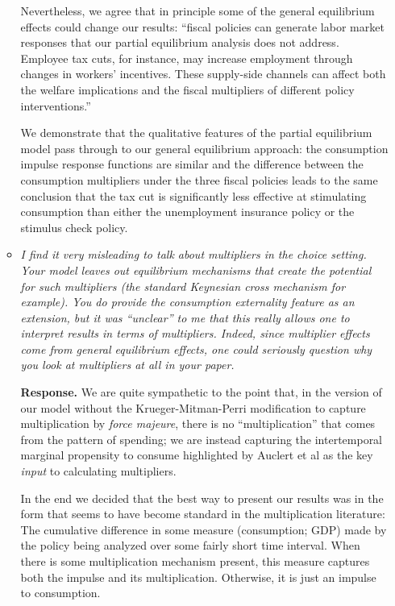 \documentclass[12pt,letterpaper,english]{article}
\begin{document}
\begin{enumerate}
\begin{itemize}
Nevertheless, we agree that in principle some of the general equilibrium effects could change our results: ``fiscal policies can generate labor market responses that our partial equilibrium
analysis does not address. Employee tax cuts, for instance, may increase employment through changes in workers’ incentives. These supply-side channels can affect both the welfare implications and the fiscal multipliers of different policy interventions.'' 

We demonstrate that the qualitative features of the partial equilibrium model pass through to our general equilibrium approach: the consumption impulse response functions are similar and the difference between the consumption multipliers under the three fiscal policies leads to the same conclusion that the tax cut is significantly less effective at stimulating consumption than either the unemployment insurance policy or the stimulus check policy.
	
	\item \textit{I find it very misleading to talk about multipliers in the choice setting. Your model leaves out equilibrium mechanisms that create the potential for such multipliers (the standard Keynesian cross mechanism for example). You do provide the consumption externality feature as an extension, but it was ``unclear'' to me that this really allows one to interpret results in terms of multipliers. Indeed, since multiplier effects come from general equilibrium effects, one could seriously question why you look at multipliers at all in your paper.}
	
          \noindent \textbf{Response.} We are quite sympathetic to the point that, in the version of our model without the Krueger-Mitman-Perri modification to capture multiplication by \textit{force majeure}, there is no ``multiplication'' that comes from the pattern of spending; we are instead capturing the intertemporal marginal propensity to consume highlighted by Auclert et al as the key \textit{input} to calculating multipliers. 

          In the end we decided that the best way to present our results was in the form that seems to have become standard in the multiplication literature: The cumulative difference in some measure (consumption; GDP) made by the policy being analyzed over some fairly short time interval. When there is some multiplication mechanism present, this measure captures both the impulse and its multiplication.  Otherwise, it is just an impulse to consumption.


\end{itemize}
\end{enumerate}
\end{document}
